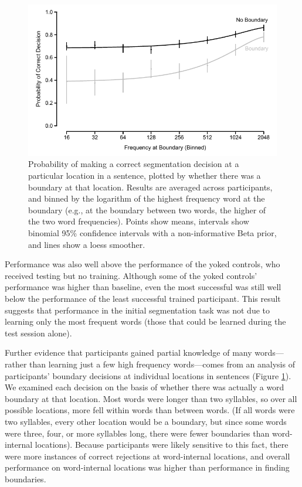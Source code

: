 \documentclass[10pt]{article}
\begin{document}
\begin{figure}[t]
\begin{center}
\includegraphics{figures/boundary_freqs_col.pdf}
\caption{\label{fig:freq} Probability of making a correct segmentation decision at a particular location in a sentence, plotted by whether there was a boundary at that location. Results are averaged across participants, and binned by the logarithm of the highest frequency word at the boundary (e.g., at the boundary between two words, the higher of the two word frequencies). Points show means, intervals show binomial 95\% confidence intervals with a non-informative Beta prior, and lines show a loess smoother.}
\end{center}
\end{figure}

Performance was also well above the performance of the yoked controls, who received testing but no training. Although some of the yoked controls' performance was higher than baseline, even the most successful was still well below the performance of the least successful trained participant. This result suggests that performance in the initial segmentation task was not due to learning only the most frequent words (those that could be learned during the test session alone). 

Further evidence that participants gained partial knowledge of many words---rather than learning just a few high frequency words---comes from an analysis of participants' boundary decisions at individual locations in sentences (Figure \ref{fig:freq}). We examined each decision on the basis of whether there was actually a word boundary at that location. Most words were longer than two syllables, so over all possible locations, more fell within words than between words. (If all words were two syllables, every other location would be a boundary, but since some words were three, four, or more syllables long, there were fewer boundaries than word-internal locations). Because participants were likely sensitive to this fact, there were more instances of correct rejections at word-internal locations, and overall performance on word-internal locations was higher than performance in finding boundaries. 
\end{document}
